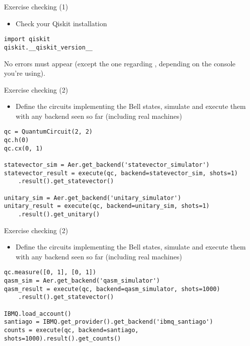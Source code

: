 
\begin{frame}[fragile]{Exercise checking (1)}

\begin{itemize} 
\item Check your Qiskit installation
\end{itemize}

\begin{verbatim}
import qiskit
qiskit.__qiskit_version__
\end{verbatim}

\bigskip No errors must appear (except the one regarding , depending on the console you're using). 

\end{frame}


\begin{frame}[fragile]{Exercise checking (2)}

\begin{itemize} 
\item Define the circuits implementing the Bell states, simulate and execute them with any backend seen so far (including real machines)
\end{itemize}

\begin{verbatim}
qc = QuantumCircuit(2, 2)
qc.h(0)
qc.cx(0, 1)

statevector_sim = Aer.get_backend('statevector_simulator')
statevector_result = execute(qc, backend=statevector_sim, shots=1)
    .result().get_statevector()

unitary_sim = Aer.get_backend('unitary_simulator')
unitary_result = execute(qc, backend=unitary_sim, shots=1)
    .result().get_unitary()
\end{verbatim}

\end{frame}


\begin{frame}[fragile]{Exercise checking (2)}

\begin{itemize} 
\item Define the circuits implementing the Bell states, simulate and execute them with any backend seen so far (including real machines)
\end{itemize}

\begin{verbatim}
qc.measure([0, 1], [0, 1])
qasm_sim = Aer.get_backend('qasm_simulator')
qasm_result = execute(qc, backend=qasm_simulator, shots=1000)
    .result().get_statevector()

IBMQ.load_account()
santiago = IBMQ.get_provider().get_backend('ibmq_santiago')
counts = execute(qc, backend=santiago, shots=1000).result().get_counts()
\end{verbatim}

\end{frame}

